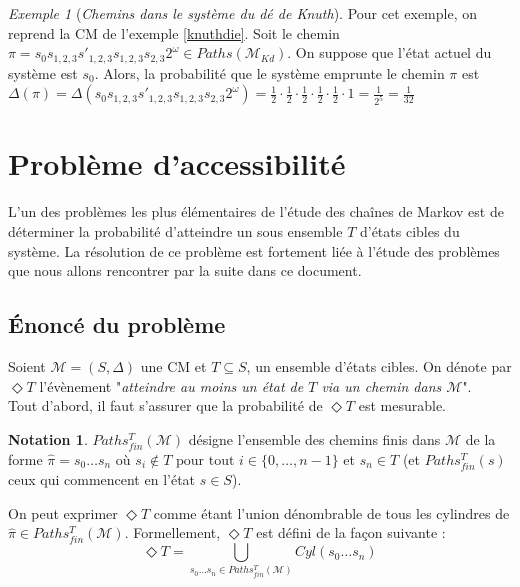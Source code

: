 \documentclass[12pt,a4paper]{report}
\theoremstyle{definition}%
\newtheorem*{notation}{Notation}
\theoremstyle{remark}
\newtheorem{example}{Exemple}[chapter]
\begin{document}
\begin{example}[\textit{Chemins dans le système du dé de Knuth}]
	Pour cet exemple, on reprend la CM de l'exemple \ref{knuthdie}. Soit le chemin $\pi = s_0 s_{1,2,3} s'_{1, 2, 3} s_{1,2,3} s_{2,3} 2^\omega \in Paths(\mathcal{M}_{Kd})$.
	On suppose que l'état actuel du système est $s_0$. Alors, la probabilité que le système emprunte le chemin $\pi$ est $\Delta(\pi) = \Delta(s_0 s_{1,2,3} s'_{1, 2, 3} s_{1,2,3} s_{2,3} 2^\omega) = \frac{1}{2} \cdot \frac{1}{2} \cdot \frac{1}{2} \cdot \frac{1}{2} \cdot \frac{1}{2} \cdot 1 = \frac{1}{2^5} = \frac{1}{32}$
\end{example}

\section{Problème d'accessibilité}

L'un des problèmes les plus élémentaires de l'étude des chaînes de Markov est de déterminer la probabilité d'atteindre un sous ensemble $T$ d'états cibles du système. La résolution de ce problème est fortement liée à l'étude des problèmes que nous allons rencontrer par la suite dans ce document.

\subsection{\'Enoncé du problème}
Soient $\mathcal{M} = (S, \Delta)$ une CM et $T \subseteq S$, un ensemble d'états cibles. On dénote par $\Diamond T$ l'évènement "\textit{atteindre au moins un état de $T$ via un chemin dans $\mathcal{M}$}". \\
Tout d'abord, il faut s'assurer que la probabilité de $\Diamond T$ est mesurable.
\begin{notation} $Paths_{fin}^T(\mathcal{M})$ désigne l'ensemble des chemins finis dans $\mathcal{M}$ de la forme $\hat{\pi} = s_0 \dots s_n$ où $s_i \notin T \text{ pour tout } i \in \{0, \dots, n-1\}$ et $s_n \in T$ (et $Paths_{fin}^T(s)$ ceux qui commencent en l'état $s \in S$).
\end{notation}
On peut exprimer $\Diamond T$ comme étant l'union dénombrable de tous les cylindres de $\hat{\pi} \in Paths_{fin}^T(\mathcal{M})$. Formellement, $\Diamond T$ est défini de la façon suivante :
\[
	\Diamond T = \bigcup_{s_0 \dots s_n \in Paths_{fin}^T(\mathcal{M})} Cyl(s_0 \dots s_n)
\]
\end{document}
